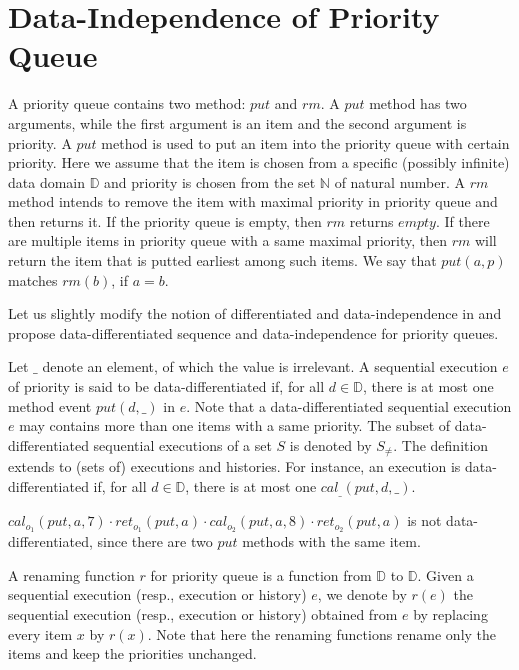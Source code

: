 \section{Data-Independence of Priority Queue}
\label{sec:data-independence of priority queue}

A priority queue contains two method: $\textit{put}$ and $\textit{rm}$. A $\textit{put}$ method has two arguments, while the first argument is an item and the second argument is priority. A $\textit{put}$ method is used to put an item into the priority queue with certain priority. Here we assume that the item is chosen from a specific (possibly infinite) data domain $\mathbb{D}$ and priority is chosen from the set $\mathbb{N}$ of natural number. A $\textit{rm}$ method intends to remove the item with maximal priority in priority queue and then returns it. If the priority queue is empty, then $\textit{rm}$ returns $\textit{empty}$. If there are multiple items in priority queue with a same maximal priority, then $\textit{rm}$ will return the item that is putted earliest among such items. We say that $\textit{put}(a,p)$ matches $\textit{rm}(b)$, if $a = b$.

Let us slightly modify the notion of differentiated and data-independence in \cite{Wolper:1986} and propose data-differentiated sequence and data-independence for priority queues.

Let $\_$ denote an element, of which the value is irrelevant. A sequential execution $e$ of priority is said to be data-differentiated if, for all $d \in \mathbb{D}$, there is at most one method event $\textit{put}(d,\_)$ in $e$. Note that a data-differentiated sequential execution $e$ may contains more than one items with a same priority. The subset of data-differentiated sequential executions of a set $S$ is denoted by $S_{\neq}$. The definition extends to (sets of) executions and histories. For instance, an execution is data-differentiated if, for all $d \in \mathbb{D}$, there is at most one $\textit{cal}_{\_}(\textit{put},d,\_)$.

\begin{example}\label{example:data-differentiated}
$\textit{cal}_{o_1}(\textit{put},a,7) \cdot \textit{ret}_{o_1}(\textit{put},a) \cdot \textit{cal}_{o_2}(\textit{put},a,8) \cdot \textit{ret}_{o_2}(\textit{put},a)$ is not data-differentiated, since there are two $\textit{put}$ methods with the same item.
\end{example}

A renaming function $r$ for priority queue is a function from $\mathbb{D}$ to $\mathbb{D}$. Given a sequential execution (resp., execution or history) $e$, we denote by $r(e)$ the sequential execution (resp., execution or history) obtained from $e$ by replacing every item $x$ by $r(x)$. Note that here the renaming functions rename only the items and keep the priorities unchanged.

